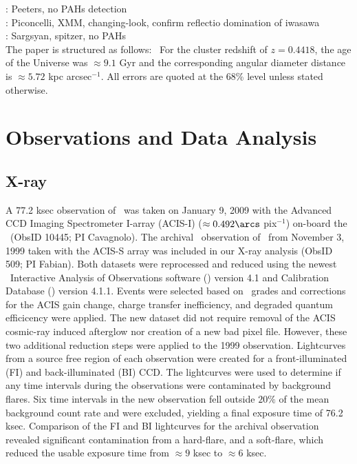 \documentclass{emulateapj}
\begin{document}
\citet{2004ApJ...613..986P}: Peeters, no PAHs detection\\

\citet{2007A&A...473...85P}: Piconcelli, XMM, changing-look, confirm
reflectio domination of iwasawa\\

\citet{2008ApJ...683..114S}: Sargsyan, spitzer, no PAHs\\

The paper is structured as follows: \WMAP\ For the cluster redshift of
$z=0.4418$, the age of the Universe was $\approx 9.1$ Gyr and the
corresponding angular diameter distance is $\approx 5.72$ kpc
arcsec$^{-1}$. All errors are quoted at the 68\% level unless stated
otherwise.

\section{Observations and Data Analysis}
\label{sec:obs}

\subsection{X-ray}
\label{sec:xray}

A 77.2 ksec observation of \iras\ was taken on January 9\th, 2009 with
the Advanced CCD Imaging Spectrometer I-array (ACIS-I) ($\approx
0.492\arcs$ pix$^{-1}$) on-board the \cxo\ (ObsID 10445; PI
Cavagnolo). The archival \chandra\ observation of \iras\ from November
3\rd, 1999 taken with the ACIS-S array was included in our X-ray
analysis (ObsID 509; PI Fabian). Both datasets were reprocessed and
reduced using the newest \chandra\ Interactive Analysis of
Observations software (\ciao) version 4.1 and Calibration Database
(\caldb) version 4.1.1. Events were selected based on \asca\ grades
and corrections for the ACIS gain change, charge transfer
inefficiency, and degraded quantum efficicency were applied. The new
dataset did not require removal of the ACIS cosmic-ray induced
afterglow nor creation of a new bad pixel file. However, these two
additional reduction steps were applied to the 1999
observation. Lightcurves from a source free region of each observation
were created for a front-illuminated (FI) and back-illuminated (BI)
CCD. The lightcurves were used to determine if any time intervals
during the observations were contaminated by background flares. Six
time intervals in the new observation fell outside $20\%$ of the mean
background count rate and were excluded, yielding a final exposure
time of 76.2 ksec. Comparison of the FI and BI lightcurves for the
archival observation revealed significant contamination from a
hard-flare, and a soft-flare, which reduced the usable exposure time
from $\approx 9$ ksec to $\approx 6$ ksec.
\end{document}
